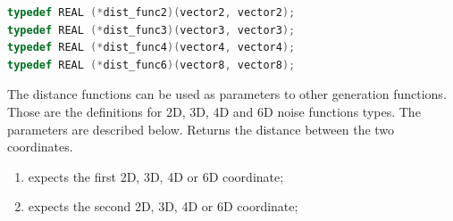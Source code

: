 \begin{lstlisting}[caption={Definition of distance function types},label={lst:distance_functions_types},language=OpenCL]
typedef REAL (*dist_func2)(vector2, vector2);
typedef REAL (*dist_func3)(vector3, vector3);
typedef REAL (*dist_func4)(vector4, vector4);
typedef REAL (*dist_func6)(vector8, vector8);
\end{lstlisting}

The distance functions can be used as parameters to other generation
functions. Those are the definitions for 2D, 3D, 4D and 6D noise functions types.
The parameters are described below. Returns the distance between the two coordinates.

\begin{enumerate}
\item expects the first 2D, 3D, 4D or 6D coordinate;
\item expects the second 2D, 3D, 4D or 6D coordinate;
\end{enumerate}
